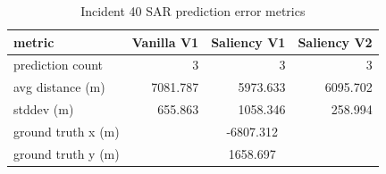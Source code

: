 \begin{table}[ht]
\centering
\caption{Incident 40 SAR prediction error metrics}
\label{tab:sar-incident-40}
\begin{tabular}{lrrr}
\hline
metric & Vanilla V1 & Saliency V1 & Saliency V2 \\
\hline
prediction count & 3 & 3 & 3 \\
avg distance (m) & 7081.787 & 5973.633 & 6095.702 \\
stddev (m) & 655.863 & 1058.346 & 258.994 \\
ground truth x (m) & \multicolumn{3}{c}{-6807.312} \\
ground truth y (m) & \multicolumn{3}{c}{1658.697} \\
\hline
\end{tabular}
\end{table}
